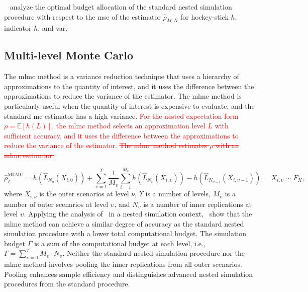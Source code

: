 ~\cite{gordy2010nested} analyze the optimal budget allocation of the standard nested simulation procedure with respect to the \gls{mse} of the estimator $\hat{\rho}_{M, N}$ for hockey-stick $h$, indicator $h$, and \gls{var}.

\subsection{Multi-level Monte Carlo}

The \gls{mlmc} method is a variance reduction technique that uses a hierarchy of approximations to the quantity of interest, and it uses the difference between the approximations to reduce the variance of the estimator.
The \gls{mlmc} method is particularly useful when the quantity of interest is expensive to evaluate, and the standard \gls{mc} estimator has a high variance.
\textcolor{red}{For the nested expectation form $\rho = \mathbb{E}[h(L)]$, the \gls{mlmc} method selects an approximation level $L$ with sufficient accuracy, and it uses the difference between the approximations to reduce the variance of the estimator.}
\textcolor{red}{\sout{The \gls{mlmc} method estimates $\rho$ with an \gls{mlmc} estimator:}}


\begin{equation*}
    \hat{\rho}^{\text{MLMC}}_\Gamma = h(\hat{L}_{N_{0}}(X_{i, 0})) + \sum_{\upsilon=1}^{\Upsilon}  \frac{1}{M_{\upsilon}} \sum_{i=1}^{M_{\upsilon}} h(\hat{L}_{N_{\upsilon}}(X_{i, \upsilon})) -  h(\hat{L}_{N_{\upsilon-1}}(X_{i, \upsilon-1}))  , \quad X_{i, \upsilon} \sim F_X,
\end{equation*}
where $X_{i, \nu}$ is the outer scenarios at level $\nu$, $\Upsilon$ is a number of levels, $M_{\upsilon}$ is a number of outer scenarios at level $\upsilon$, and $N_{\upsilon}$ is a number of inner replications at level $\upsilon$.
Applying the analysis of~\cite{giles2015multilevel} in a nested simulation context,~\cite{giles2019multilevel} show that the \gls{mlmc} method can achieve a similar degree of accuracy as the standard nested simulation procedure with a lower total computational budget.
The simulation budget $\Gamma$ is a sum of the computational budget at each level, i.e., $\Gamma = \sum_{\upsilon=0}^{\Upsilon} M_{\upsilon} \cdot N_{\upsilon}$.
Neither the standard nested simulation procedure nor the \gls{mlmc} method involves pooling the inner replications from all outer scenarios.
Pooling enhances sample efficiency and distinguishes advanced nested simulation procedures from the standard procedure.

